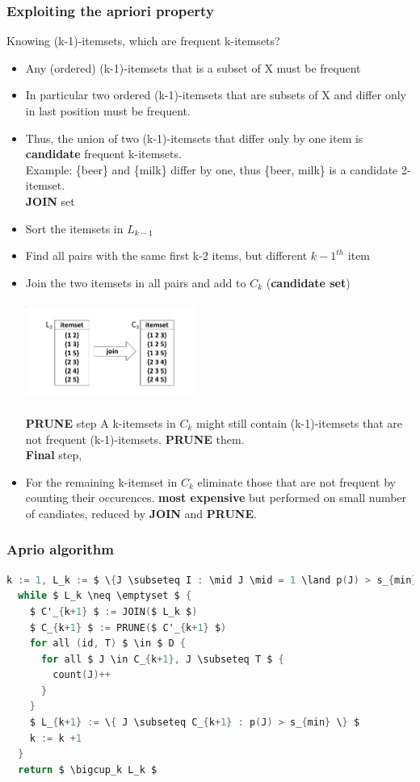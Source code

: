 \subsubsection{Exploiting the apriori property}
  Knowing (k-1)-itemsets, which are frequent k-itemsets?
\begin{itemize}
\item Any (ordered) (k-1)-itemsets that is a subset of X must be frequent
\item In particular two ordered (k-1)-itemsets that are subsets of X
  and differ only in last position must be frequent.
\item Thus, the union of two (k-1)-itemsets that differ only by one
  item is \textbf{candidate} frequent k-itemsets. \\
  Example: \{beer\} and \{milk\} differ by one, thus \{beer, milk\} is
  a candidate 2-itemset. \\
  \textbf{JOIN} set
\item Sort the itemsets in $ L_{k-1} $
\item Find all pairs with the same first k-2 items, but different
 $ k-1^{th} $ item
\item Join the two itemsets in all pairs and add to $ C_k $
  (\textbf{candidate set})
  \includegraphics[height=150px,width=210px]{join}
  \\
  \quad \textbf{PRUNE} step
  A k-itemsets in $ C_k $ might still contain (k-1)-itemsets that are not
  frequent (k-1)-itemsets. \textbf{PRUNE} them. \\
  \quad \textbf{Final} step,
\item For the remaining k-itemset in $ C_k $ eliminate those that are not
  frequent by counting their occurences. \textbf{most expensive} but
  performed on small number of candiates, reduced by \textbf{JOIN} and
  \textbf{PRUNE}.
\end{itemize}

\subsubsection{Aprio algorithm}
\begin{lstlisting}[language=C,mathescape=true]
  k := 1, L_k := $ \{J \subseteq I : \mid J \mid = 1 \land p(J) > s_{min} \} $
  while $ L_k \neq \emptyset $ {
    $ C'_{k+1} $ := JOIN($ L_k $)
    $ C_{k+1} $ := PRUNE($ C'_{k+1} $)
    for all (id, T) $ \in $ D {
      for all $ J \in C_{k+1}, J \subseteq T $ {
        count(J)++
      }
    }
    $ L_{k+1} := \{ J \subseteq C_{k+1} : p(J) > s_{min} \} $
    k := k +1
  }
  return $ \bigcup_k L_k $
\end{lstlisting}

